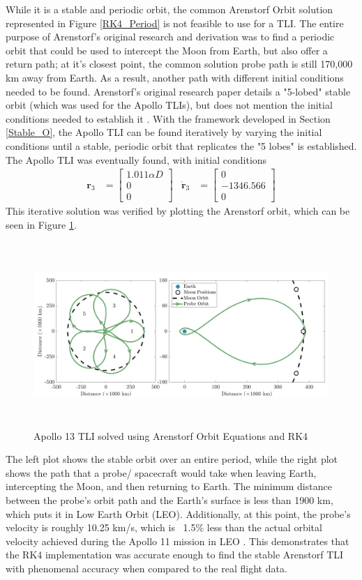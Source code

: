 \documentclass[conf]{new-aiaa}
\begin{document}
    While it is a stable and periodic orbit, the common Arenstorf Orbit solution represented in Figure \ref{RK4_Period} is not feasible to use for a TLI. The entire purpose of Arenstorf's original research and derivation was to find a periodic orbit that could be used to intercept the Moon from Earth, but also offer a return path; at it's closest point, the common solution probe path is still 170,000 km away from Earth. As a result, another path with different initial conditions needed to be found. Arenstorf's original research paper details a "5-lobed" stable orbit (which was used for the Apollo TLIs), but does not mention the initial conditions needed to establish it \cite{Aren_paper}. With the framework developed in Section \ref{Stable_O}, the Apollo TLI can be found iteratively by varying the initial conditions until a stable, periodic orbit that replicates the "5 lobes" is established. The Apollo TLI was eventually found, with initial conditions
    \begin{align}
	    \bm{r}_3 &= \begin{bmatrix}
		1.011\alpha D \\ 0 \\ 0
	    \end{bmatrix}
        &
	    \bm{\dot{r}}_3 &= \begin{bmatrix}
		0 \\ -1346.566 \\ 0
	    \end{bmatrix}
    \end{align} 
    This iterative solution was verified by plotting the Arenstorf orbit, which can be seen in Figure \ref{TLI}.
    \begin{figure}[H]
        \centering
        \includegraphics[height = 7cm]{Figures/Arenstorf/TLI.png}
        \caption{Apollo 13 TLI solved using Arenstorf Orbit Equations and RK4}
        \label{TLI}
    \end{figure}
    The left plot shows the stable orbit over an entire period, while the right plot shows the path that a probe/ spacecraft would take when leaving Earth, intercepting the Moon, and then returning to Earth. The minimum distance between the probe's orbit path and the Earth's surface is less than 1900 km, which puts it in Low Earth Orbit (LEO). Additionally, at this point, the probe's velocity is roughly 10.25 km/s, which is ~1.5\% less than the actual orbital velocity achieved during the Apollo 11 mission in LEO \cite{Apollo}. This demonstrates that the RK4 implementation was accurate enough to find the stable Arenstorf TLI with phenomenal accuracy when compared to the real flight data.
\end{document}
